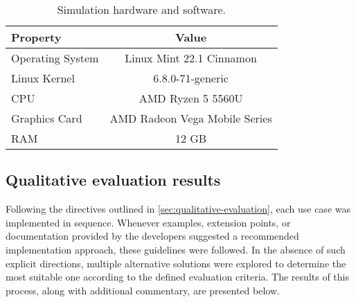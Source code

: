 \documentclass[twoside, 11pt]{article}
\begin{document}
\begin{table}[h]
  \begin{center}
    \caption[Simulation hardware and software]{Simulation hardware and software.}
    \begin{tabular}{ | l | c | } 
      \hline
      Property & Value \\ 
      \hline 
      Operating System & Linux Mint 22.1 Cinnamon \\
      \hline
      Linux Kernel & 6.8.0-71-generic \\
      \hline
      CPU & AMD Ryzen 5 5560U \\
      \hline
      Graphics Card & AMD Radeon Vega Mobile Series \\
      \hline
      RAM & 12 GB \\
      \hline
    \end{tabular}
    \label{table:pc-specs}
  \end{center}
\end{table}


\subsection{Qualitative evaluation results}

Following the directives outlined in \autoref{sec:qualitative-evaluation}, each use case was implemented in sequence. Whenever examples, extension points, or documentation provided by the developers suggested a recommended implementation approach, these guidelines were followed. In the absence of such explicit directions, multiple alternative solutions were explored to determine the most suitable one according to the defined evaluation criteria. The results of this process, along with additional commentary, are presented below.
\end{document}
